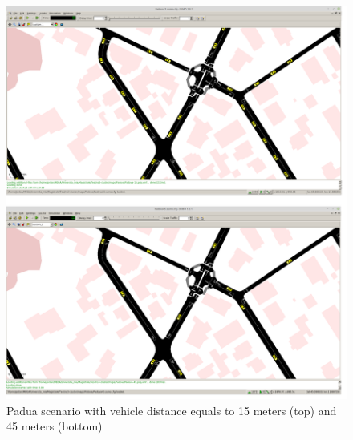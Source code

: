 	\begin{figure}[H]
		\centering
		\includegraphics[width=\textwidth]{immagini/sumo-distances}
		\caption{Padua scenario with vehicle distance equals to 15 meters (top) and 45 meters (bottom)}
		\label{fig:sumo-distances}
	\end{figure}
%	
